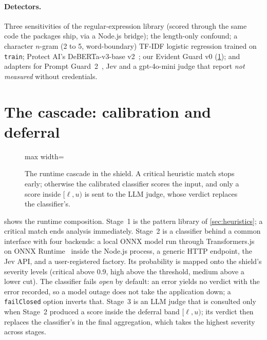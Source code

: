 \documentclass[10pt,a4paper]{article}
\newcommand{\eg}{Evident Guard v0}
\begin{document}
\paragraph{Detectors.} Three sensitivities of the regular-expression library (scored through the same code the packages ship, via a Node.js bridge); the length-only confound; a character $n$-gram (2 to 5, word-boundary) TF-IDF logistic regression trained on \texttt{train}; Protect AI's DeBERTa-v3-base v2~\cite{protectai2024deberta}; our \eg{} (\cref{sec:cascade}); and adapters for Prompt Guard~2~\cite{meta2025promptguard2}, Jev and a gpt-4o-mini judge that report \emph{not measured} without credentials.

\section{The cascade: calibration and deferral}
\label{sec:cascade}

\begin{figure}[t]
\centering
\begin{adjustbox}{max width=\linewidth}

\end{adjustbox}
\caption{The runtime cascade in the shield. A critical heuristic match stops early; otherwise the calibrated classifier scores the input, and only a score inside $[\ell, u)$ is sent to the LLM judge, whose verdict replaces the classifier's.}
\label{fig:cascade}
\end{figure}

 shows the runtime composition. Stage~1 is the pattern library of \cref{sec:heuristics}; a critical match ends analysis immediately. Stage~2 is a classifier behind a common interface with four backends: a local ONNX model run through Transformers.js~\cite{transformersjs} on ONNX Runtime~\cite{onnxruntime} inside the Node.js process, a generic HTTP endpoint, the Jev API, and a user-registered factory. Its probability is mapped onto the shield's severity levels (critical above 0.9, high above the threshold, medium above a lower cut). The classifier fails \emph{open} by default: an error yields no verdict with the error recorded, so a model outage does not take the application down; a \texttt{failClosed} option inverts that. Stage~3 is an LLM judge that is consulted only when Stage~2 produced a score inside the deferral band $[\ell, u)$; its verdict then replaces the classifier's in the final aggregation, which takes the highest severity across stages.
\end{document}
